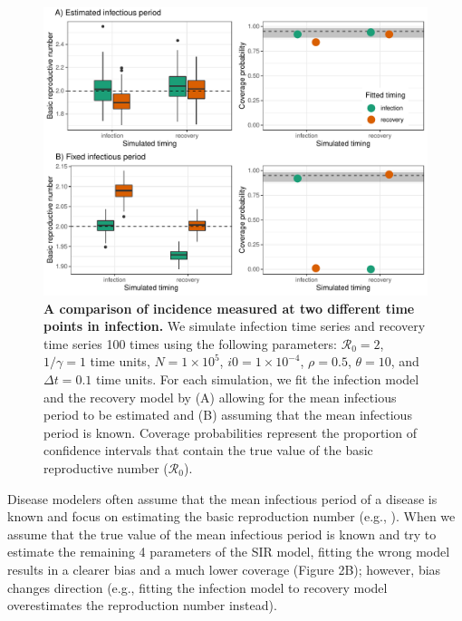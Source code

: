 \documentclass{article}\usepackage[]{graphicx}\usepackage[]{color}
\begin{document}
\begin{figure}
\includegraphics[width=\textwidth]{../figure/compare_deterministic.pdf}
\caption{
\textbf{A comparison of incidence measured at two different time points in infection.}
We simulate infection time series and recovery time series 100 times using the 
following parameters:  
$\mathcal R_0 = 2$, $1/\gamma = 1$ time units, $N = 1 \times 10^5$, $i0 = 1 \times 10^{-4}$,
$\rho = 0.5$, $\theta = 10$, and $\Delta t = 0.1$ time units.
For each simulation, we fit the infection model and the recovery model by
(A) allowing for the mean infectious period to be estimated and (B) assuming
that the mean infectious period is known.
Coverage probabilities represent the proportion of confidence intervals
that contain the true value of the basic reproductive number ($\mathcal R_0$).
}
\end{figure}

Disease modelers often assume that the mean infectious period of a disease
is known and focus on estimating the basic reproduction number (e.g.,
\cite{hooker2010parameterizing, lin2016seasonality, pons2018serotype}). 
When we assume that the true value of the mean infectious period is known
and try to estimate the remaining 4 parameters of the SIR model, fitting the
wrong model results in a clearer bias and a much lower coverage (Figure 2B); however, 
bias changes direction (e.g., fitting the infection
model to recovery model overestimates the reproduction number instead). 
\end{document}
